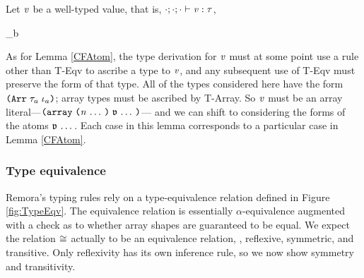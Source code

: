 \begin{lemma}
  \label{CFArray}
  Let $\mathit{v}$ be a well-typed value,
  that is, $\cdot;\cdot;\cdot \vdash \mathit{v} : \mathit{\tau}$,
  \begin{enumerate}
    {\cfarritem
      {\val}
      {}
      {\func}}
    {\cfarritem
      {\val}
      {}
      {}}
    {\cfarritem
      {\val}
      {}
      {}}
    {
      {}
      {\dsum
        {\sequence{\idx}}
        {\val_b}
        {}}}
    {
      {\basetype}
      {\baseval}}
  \end{enumerate}
\end{lemma}
\begin{sproof}
  As for Lemma \ref{CFAtom},
  the type derivation for $\mathit{v}$ must at some point use a rule other than {\sc T-Eqv}
  to ascribe a type to $\mathit{v}$,
  and any subsequent use of {\sc T-Eqv} must preserve the form of that type.
  All of the types considered here have the form $\typearray{\type_a}{\idx_a}$;
  array types must be ascribed by {\sc T-Array}.
  So $\mathit{v}$ must be an array literal---$\arrlit{\sequence{\atval}}{\sequence{\nat}}$---%
  and we can shift to considering the forms of the atoms $\mathfrak{v} \, \ldots \,$.
  Each case in this lemma corresponds to a particular case in Lemma \ref{CFAtom}.
\end{sproof}


\subsubsection{Type equivalence} \label{TypeEqvProse}
\FigTypeEqv
Remora's typing rules rely on a type-equivalence relation
defined in Figure \ref{fig:TypeEqv}.
The equivalence relation is essentially $\alpha$-equivalence
augmented with a check as to whether array shapes are guaranteed to be equal.
We expect the relation $\cong$ actually to be an equivalence relation,
\ie, reflexive, symmetric, and transitive.
Only reflexivity has its own inference rule,
so we now show symmetry and transitivity.

